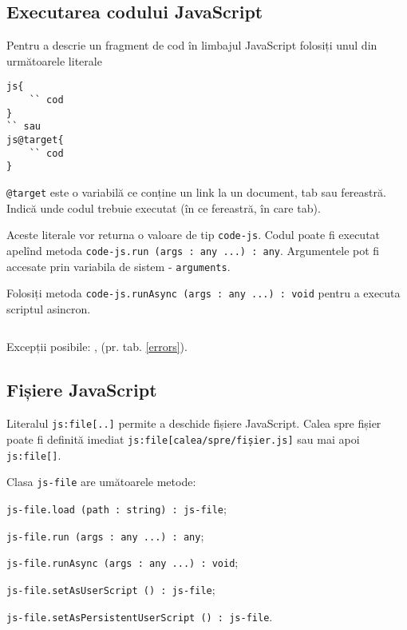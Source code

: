 \subsection{Executarea codului JavaScript}

Pentru a descrie un fragment de cod în limbajul JavaScript folosiți unul din următoarele literale 
\begin{verbatim}
js{
	`` cod
}
`` sau
js@target{
	`` cod
}
\end{verbatim}

\texttt{@target} este o variabilă ce conține un link la un document, tab sau fereastră. Indică unde codul trebuie executat (în ce fereastră, în care tab).

Aceste literale vor returna o valoare de tip \texttt{code-js}. Codul poate fi executat apelînd metoda \texttt{code-js.run (args : any ...) : any}. Argumentele pot fi accesate prin variabila de sistem - \texttt{arguments}.

Folosiți metoda \texttt{code-js.runAsync (args : any ...) : void} pentru a executa scriptul asincron.

\begin{sourcecode}
    \label{jsrunex1}
    \inputminted[linenos]{icl}{../sources/jsrunex1.icL}
\end{sourcecode}

Excepții posibile: ,  (pr. tab. \ref{errors}).

\subsection{Fișiere JavaScript}

Literalul \texttt{js:file[..]} permite a deschide fișiere JavaScript. Calea spre fișier poate fi definită imediat \texttt{js:file[calea/spre/fișier.js]} sau mai apoi \texttt{js:file[]}.

Clasa \texttt{js-file} are umătoarele metode:
\begin{icItems}
\item \texttt{js-file.load (path : string) : js-file};
\item \texttt{js-file.run (args : any ...) : any};
\item \texttt{js-file.runAsync (args : any ...) : void};
\item \texttt{js-file.setAsUserScript () : js-file};
\item \texttt{js-file.setAsPersistentUserScript () : js-file}.
\end{icItems}

